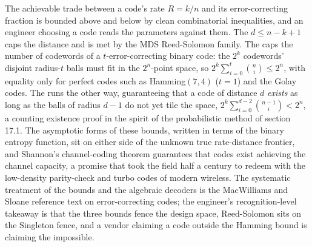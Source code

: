 \begin{mastery}
The achievable trade between a code's rate $R = k/n$ and its
error-correcting fraction is bounded above and below by clean
combinatorial inequalities, and an engineer choosing a code reads the
parameters against them. The  $d \leq n - k
+ 1$ caps the distance and is met by the MDS Reed-Solomon family. The
 caps the number of codewords
of a $t$-error-correcting binary code: the $2^{k}$ codewords' disjoint
radius-$t$ balls must fit in the $2^{n}$-point space, so $2^{k}
\sum_{i=0}^{t} \binom{n}{i} \leq 2^{n}$, with equality only for
perfect codes such as Hamming$(7, 4)$ ($t = 1$) and the Golay codes.
The  runs the other way, guaranteeing
that a code of distance $d$ \emph{exists} as long as the balls of
radius $d - 1$ do not yet tile the space, $2^{k} \sum_{i=0}^{d-2}
\binom{n-1}{i} < 2^{n}$, a counting existence proof in the spirit of
the probabilistic method of section 17.1. The asymptotic forms of
these bounds, written in terms of the binary entropy function, sit on
either side of the unknown true rate-distance frontier, and Shannon's
channel-coding theorem \cite{paper:shannon1948} guarantees that codes
exist achieving the channel capacity, a promise that took the field
half a century to redeem with the low-density parity-check and turbo
codes of modern wireless. The systematic treatment of the bounds and
the algebraic decoders is the MacWilliams and Sloane reference text on
error-correcting codes; the engineer's recognition-level takeaway is
that the three bounds
fence the design space, Reed-Solomon sits on the Singleton fence, and
a vendor claiming a code outside the Hamming bound is claiming the
impossible.
\end{mastery}

